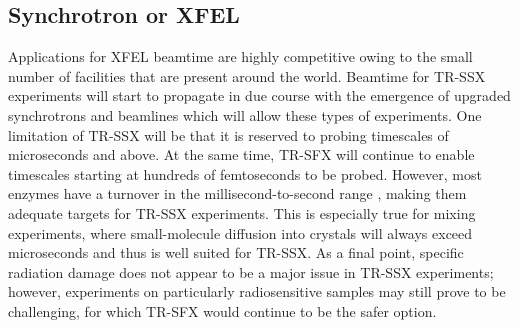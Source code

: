 \subsection{Synchrotron or XFEL}

Applications for XFEL beamtime are highly competitive owing to the small number of facilities that are present around the world. Beamtime for TR-SSX experiments will start to propagate in due course with the emergence of upgraded synchrotrons and beamlines which will allow these types of experiments. One limitation of TR-SSX will be that it is reserved to probing timescales of microseconds and above. At the same time, TR-SFX will continue to enable timescales starting at hundreds of femtoseconds to be probed. However, most enzymes have a turnover in the millisecond-to-second range \parencite{bar-evenModeratelyEfficientEnzyme2011}, making them adequate targets for TR-SSX experiments. This is especially true for mixing experiments, where small-molecule diffusion into crystals will always exceed microseconds and thus is well suited for TR-SSX. As a final point, specific radiation damage does not appear to be a major issue in TR-SSX experiments; however, experiments on particularly radiosensitive samples may still prove to be challenging, for which TR-SFX would continue to be the safer option.